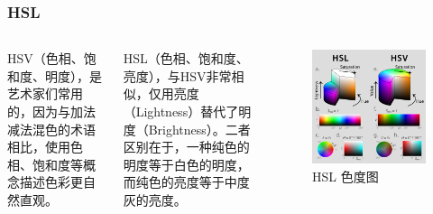 \documentclass[8pt, aspectratio=169]{ctexbeamer}
\begin{document}
\begin{frame}
	\frametitle{HSL}
	\begin{columns}
		HSV（色相、饱和度、明度），是艺术家们常用的，因为与加法减法混色的术语相比，使用色相、饱和度等概念描述色彩更自然直观。

		HSL（色相、饱和度、亮度），与HSV非常相似，仅用亮度（Lightness）替代了明度（Brightness）。二者区别在于，一种纯色的明度等于白色的明度，而纯色的亮度等于中度灰的亮度。

		\begin{figure}
			\includegraphics[width=0.7\linewidth]{hsl.png}
			\caption{HSL 色度图}
		\end{figure}
	\end{columns}
\end{frame}


\end{document}
